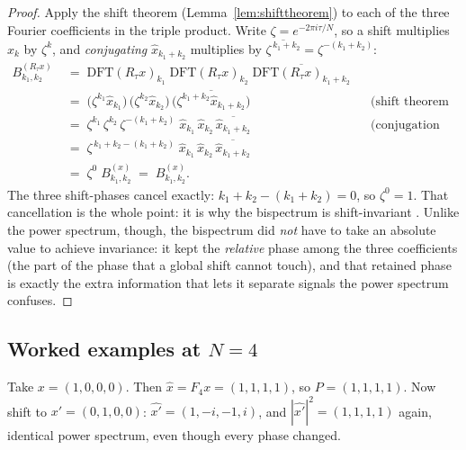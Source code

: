 \begin{proof}
Apply the shift theorem (Lemma~\ref{lem:shifttheorem}) to each of the three Fourier
coefficients in the triple product. Write $\zeta = e^{-2\pi i \tau/N}$, so a shift
multiplies $\widehat x_k$ by $\zeta^{k}$, and \emph{conjugating} $\widehat x_{k_1+k_2}$
multiplies by $\overline{\zeta^{\,k_1+k_2}} = \zeta^{-(k_1+k_2)}$:
\begin{align*}
  B^{(R_\tau x)}_{k_1,k_2}
    \;&=\; \mathrm{DFT}(R_\tau x)_{k_1}\;
           \mathrm{DFT}(R_\tau x)_{k_2}\;
           \overline{\mathrm{DFT}(R_\tau x)_{k_1+k_2}} \\
    \;&=\; \bigl(\zeta^{k_1}\widehat x_{k_1}\bigr)\,
           \bigl(\zeta^{k_2}\widehat x_{k_2}\bigr)\,
           \overline{\bigl(\zeta^{k_1+k_2}\widehat x_{k_1+k_2}\bigr)}
        &&\text{(shift theorem on each factor)} \\
    \;&=\; \zeta^{k_1}\,\zeta^{k_2}\,\zeta^{-(k_1+k_2)}\;
           \widehat x_{k_1}\,\widehat x_{k_2}\,\overline{\widehat x_{k_1+k_2}}
        &&\text{(conjugation flips the phase)} \\
    \;&=\; \zeta^{\,k_1 + k_2 - (k_1 + k_2)}\;
           \widehat x_{k_1}\,\widehat x_{k_2}\,\overline{\widehat x_{k_1+k_2}} \\
    \;&=\; \zeta^{0}\; B^{(x)}_{k_1,k_2}
        \;=\; B^{(x)}_{k_1,k_2} .
\end{align*}
The three shift-phases cancel exactly: $k_1 + k_2 - (k_1+k_2) = 0$, so $\zeta^0 = 1$.
That cancellation is the whole point: it is why the bispectrum is shift-invariant
\citep{invariants_kakarala,invariants_chen}. Unlike the power spectrum, though, the
bispectrum did \emph{not} have to take an absolute value to achieve invariance: it kept
the \emph{relative} phase among the three coefficients (the part of the phase that a
global shift cannot touch), and that retained phase is exactly the extra information
that lets it separate signals the power spectrum confuses.
\end{proof}

\subsection{Worked examples at {\boldmath$N=4$}}

\begin{example}
\label{ex:psn4}
Take $x = (1,0,0,0)$. Then $\widehat x = F_4 x = (1,1,1,1)$, so $P = (1,1,1,1)$. Now
shift to $x' = (0,1,0,0)$: $\widehat{x'} = (1,-i,-1,i)$, and $|\widehat{x'}|^2 =
(1,1,1,1)$ again, identical power spectrum, even though every phase changed.
\end{example}

